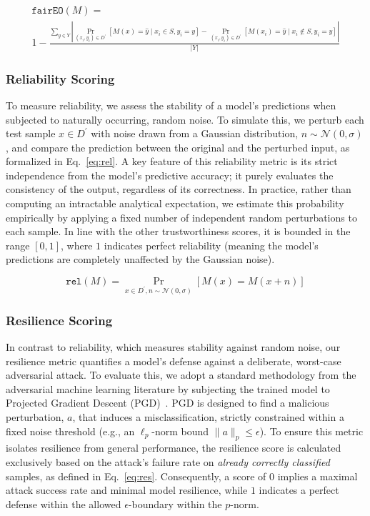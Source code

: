 \documentclass[acmsmall]{acmart}
\begin{document}
\begin{equation}
    \label{eq:fairEO}
    \begin{split}
    \mathtt{fairEO}(M) = \\
    1 - \frac{\sum\limits_{y\in Y} \left| \Pr\limits_{(x_i,y_i)\in D^\prime}[M(x)=\hat{y} \mid x_i\in S, y_i=y] - \Pr\limits_{(x_i,y_i)\in D^\prime}[M(x_i)=\hat{y} \mid x_i\notin S, y_i=y] \right|}{|Y|}
    \end{split}
\end{equation}

\subsubsection*{Reliability Scoring}

To measure reliability, we assess the stability of a model's predictions when subjected to naturally occurring, random noise. To simulate this, we perturb each test sample $x\in D^\prime$ with noise drawn from a Gaussian distribution, $n\sim \mathcal{N}(0,\sigma)$, and compare the prediction between the original and the perturbed input, as formalized in Eq.~\eqref{eq:rel}. A key feature of this reliability metric is its strict independence from the model's predictive accuracy; it purely evaluates the consistency of the output, regardless of its correctness. In practice, rather than computing an intractable analytical expectation, we estimate this probability empirically by applying a fixed number of independent random perturbations to each sample. In line with the other trustworthiness scores, it is bounded in the range $[0, 1]$, where $1$ indicates perfect reliability (meaning the model's predictions are completely unaffected by the Gaussian noise).

\begin{equation}
    \label{eq:rel}
    \mathtt{rel}(M) = \Pr_{x\in D^\prime, n\sim\mathcal{N}(0,\sigma)}[M(x) = M(x+n)]
\end{equation}

\subsubsection*{Resilience Scoring}

In contrast to reliability, which measures stability against random noise, our resilience metric quantifies a model's defense against a deliberate, worst-case adversarial attack. To evaluate this, we adopt a standard methodology from the adversarial machine learning literature by subjecting the trained model to Projected Gradient Descent (PGD)~\cite{madry2017towards}. PGD is designed to find a malicious perturbation, $a$, that induces a misclassification, strictly constrained within a fixed noise threshold (e.g., an $\ell_p$-norm bound $\|a\|_p \leq \epsilon$). To ensure this metric isolates resilience from general performance, the resilience score is calculated exclusively based on the attack's failure rate on \textit{already correctly classified} samples, as defined in Eq.~\eqref{eq:res}. Consequently, a score of $0$ implies a maximal attack success rate and minimal model resilience, while $1$ indicates a perfect defense within the allowed $\epsilon$-boundary within the $p$-norm.
\end{document}
